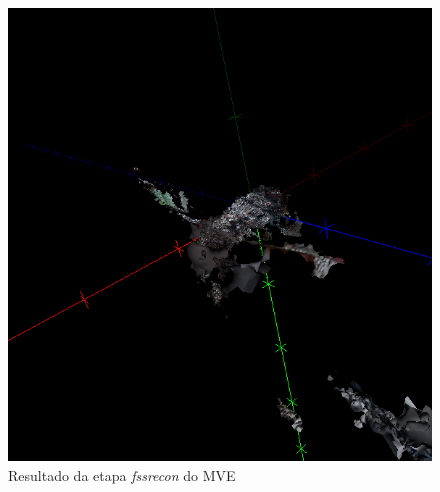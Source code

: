 


 \begin{figure}[!h]
 	\centering
 	\includegraphics[width=0.7\linewidth]{figs/galinhadmr.png}
 	\caption{%
 	Resultado da etapa \emph{fssrecon} do MVE
 	}\label{fig:galinhaFssr}
 \end{figure}

\newpage

